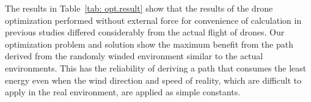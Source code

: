 \documentclass[journal]{./template/IEEEtran}
\begin{document}
\begin{table}[ht]
\caption{Comparison of the energy consumption between the baseline and the optimal path affected by wind effect in each case.}
\label{tab: opt.result}
\end{table}

The results in Table~\ref{tab: opt.result} show that the results of the drone optimization performed without external force for convenience of calculation in previous studies differed considerably from the actual flight of drones.
Our optimization problem and solution show the maximum benefit from the path derived from the randomly winded environment similar to the actual environments. This has the reliability of deriving a path that consumes the least energy even when the wind direction and speed of reality, which are difficult to apply in the real environment, are applied as simple constants.
\end{document}
